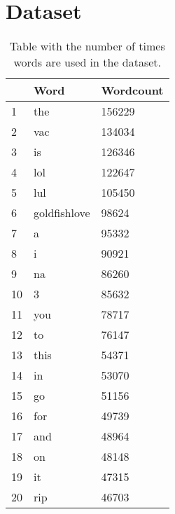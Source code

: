 \documentclass[final]{report}
\begin{document}
\chapter{Dataset}
\label{ch:dataset}

\begin{table}[]
\centering
\caption{Table with the number of times words are used in the dataset.}
\label{wordcounttabel}
\begin{tabular}{l|l|l|}
\cline{2-3}
                         & Word         & Wordcount \\ \hline
\multicolumn{1}{|l|}{1}  & the          & 156229    \\ \hline
\multicolumn{1}{|l|}{2}  & vac          & 134034    \\ \hline
\multicolumn{1}{|l|}{3}  & is           & 126346    \\ \hline
\multicolumn{1}{|l|}{4}  & lol          & 122647    \\ \hline
\multicolumn{1}{|l|}{5}  & lul          & 105450    \\ \hline
\multicolumn{1}{|l|}{6}  & goldfishlove & 98624     \\ \hline
\multicolumn{1}{|l|}{7}  & a            & 95332     \\ \hline
\multicolumn{1}{|l|}{8}  & i            & 90921     \\ \hline
\multicolumn{1}{|l|}{9}  & na           & 86260     \\ \hline
\multicolumn{1}{|l|}{10} & 3            & 85632     \\ \hline
\multicolumn{1}{|l|}{11} & you          & 78717     \\ \hline
\multicolumn{1}{|l|}{12} & to           & 76147     \\ \hline
\multicolumn{1}{|l|}{13} & this         & 54371     \\ \hline
\multicolumn{1}{|l|}{14} & in           & 53070     \\ \hline
\multicolumn{1}{|l|}{15} & go           & 51156     \\ \hline
\multicolumn{1}{|l|}{16} & for          & 49739     \\ \hline
\multicolumn{1}{|l|}{17} & and          & 48964     \\ \hline
\multicolumn{1}{|l|}{18} & on           & 48148     \\ \hline
\multicolumn{1}{|l|}{19} & it           & 47315     \\ \hline
\multicolumn{1}{|l|}{20} & rip          & 46703     \\ \hline

\end{tabular}
\end{table}
\end{document}
